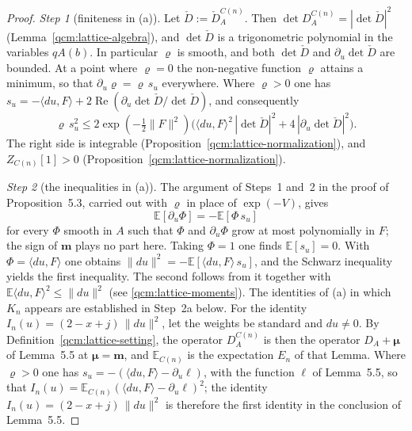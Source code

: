 \documentclass[11pt,letterpaper,reqno]{amsart}
\theoremstyle{definition}
\begin{document}
\begin{proof}
\emph{Step 1} (finiteness in (a)).
Let $\check D:=\check D^{C(n)}_A$.
Then $\det D^{C(n)}_A=|\det\check D|^2$ (Lemma~\ref{qcm:lattice-algebra}), and $\det\check D$ is a trigonometric polynomial in the variables $qA(b)$.
In particular $\varrho$ is smooth, and both $\det\check D$ and $\partial_u\det\check D$ are bounded.
At a point where $\varrho=0$ the non-negative function $\varrho$ attains a minimum, so that $\partial_u\varrho=\varrho\,s_u$ everywhere.
Where $\varrho>0$ one has $s_u=\allowbreak -\langle du,\allowbreak F\rangle+2\operatorname{Re}(\partial_u\det\check D/\det\check D)$, and consequently
\begin{equation*}
\varrho\,s_u^2\le2\exp(-\tfrac12\|F\|^2)\bigl(\langle du,F\rangle^2\,|\det\check D|^2+4\,|\partial_u\det\check D|^2\bigr).
\end{equation*}
The right side is integrable (Proposition~\ref{qcm:lattice-normalization}), and $Z_{C(n)}[1]>0$ (Proposition~\ref{qcm:lattice-normalization}).

\emph{Step 2} (the inequalities in (a)).
The argument of Steps~1 and~2 in the proof of Proposition~5.3, carried out with $\varrho$ in place of $\exp(-V)$, gives
\begin{equation*}
\mathbb E[\partial_u\Phi]=-\mathbb E[\Phi\,s_u]
\end{equation*}
for every $\Phi$ smooth in $A$ such that $\Phi$ and $\partial_u\Phi$ grow at most polynomially in $F$; the sign of $\mathbf m$ plays no part here.
Taking $\Phi=1$ one finds $\mathbb E[s_u]=0$.
With $\Phi=\langle du,F\rangle$ one obtains $\|du\|^2=-\mathbb E[\langle du,F\rangle\,s_u]$, and the Schwarz inequality yields the first inequality.
The second follows from it together with $\mathbb E\langle du,F\rangle^2\le\|du\|^2$ (see \eqref{qcm:lattice-moments}).
The identities of (a) in which $K_n$ appears are established in Step~2a below.
For the identity $I_n(u)=(2-x+j)\,\|du\|^2$, let the weights be standard and $du\ne0$.
By Definition~\ref{qcm:lattice-setting}, the operator $D^{C(n)}_A$ is then the operator $D_A+\boldsymbol\mu$ of Lemma~5.5 at $\boldsymbol\mu=\mathbf m$, and $\mathbb E_{C(n)}$ is the expectation $E_n$ of that Lemma.
Where $\varrho>0$ one has $s_u=-(\langle du,F\rangle-\partial_u\ell)$, with the function $\ell$ of Lemma~5.5, so that $I_n(u)=\mathbb E_{C(n)}(\langle du,F\rangle-\partial_u\ell)^2$; the identity $I_n(u)=(2-x+j)\,\|du\|^2$ is therefore the first identity in the conclusion of Lemma~5.5.


\end{proof}
\end{document}
